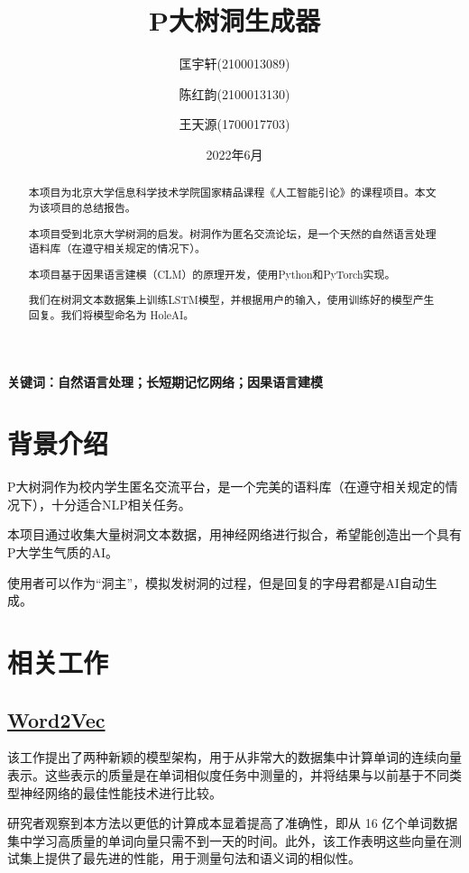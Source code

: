 \documentclass[12pt,a4paper]{article}
\title{P大树洞生成器}
\author[1]{匡宇轩(2100013089)}
\author[1]{陈红韵(2100013130)}
\author[2]{王天源(1700017703)}
\affil[1]{北京大学信息科学技术学院}
\affil[2]{北京大学元培学院}
\date{2022年6月}
\begin{document}
\maketitle
\newpage
\renewcommand{\abstractname}{\large 摘要\\}
\begin{abstract}
\normalsize
    本项目为北京大学信息科学技术学院国家精品课程《人工智能引论》的课程项目。本文为该项目的总结报告。
    
    本项目受到北京大学树洞的启发。树洞作为匿名交流论坛，是一个天然的自然语言处理语料库（在遵守相关规定的情况下）。

    本项目基于因果语言建模（CLM）的原理开发，使用Python和PyTorch实现。

    我们在树洞文本数据集上训练LSTM模型，并根据用户的输入，使用训练好的模型产生回复。我们将模型命名为 HoleAI。

\end{abstract}

\textbf{关键词：自然语言处理；长短期记忆网络；因果语言建模}

\newpage
\tableofcontents


\section{背景介绍}
P大树洞作为校内学生匿名交流平台，是一个完美的语料库（在遵守相关规定的情况下），十分适合NLP相关任务。

本项目通过收集大量树洞文本数据，用神经网络进行拟合，希望能创造出一个具有P大学生气质的AI。

使用者可以作为“洞主”，模拟发树洞的过程，但是回复的字母君都是AI自动生成。
\section{相关工作}
\subsection{\href{https://arxiv.org/abs/1301.3781}{Word2Vec}}
该工作提出了两种新颖的模型架构，用于从非常大的数据集中计算单词的连续向量表示。这些表示的质量是在单词相似度任务中测量的，并将结果与以前基于不同类型神经网络的最佳性能技术进行比较。

研究者观察到本方法以更低的计算成本显着提高了准确性，即从 16 亿个单词数据集中学习高质量的单词向量只需不到一天的时间。此外，该工作表明这些向量在测试集上提供了最先进的性能，用于测量句法和语义词的相似性。\cite{ref1}
\end{document}
